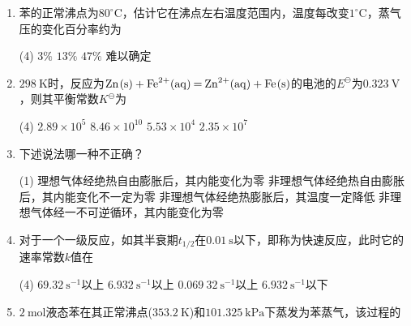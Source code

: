 \begin{enumerate}[label=\arabic*., itemsep=1.5ex]
    \begin{tasks}(4)
        \task 必定改变
        \task 必定不变
        \task 不一定变
        \task 状态与内能无关
    \end{tasks}
    \item 苯的正常沸点为$80^\circ\mathrm{C}$，估计它在沸点左右温度范围内，温度每改变$1^\circ\mathrm{C}$，蒸气压的变化百分率约为
    \begin{tasks}(4)
        \task $3\%$
        \task $13\%$
        \task $47\%$
        \task 难以确定
    \end{tasks}
    \item $298\ \mathrm{K}$时，反应为$\ce{Zn(s) + Fe^{2+}(aq) = Zn^{2+}(aq) + Fe(s)}$的电池的$E^\ominus$为$0.323\ \mathrm{V}$，则其平衡常数$K^\ominus$为
    \begin{tasks}(4)
        \task $2.89\times10^5$
        \task $8.46\times10^{10}$
        \task $5.53\times10^4$
        \task $2.35\times10^7$
    \end{tasks}
    \item 下述说法哪一种不正确？
    \begin{tasks}(1)
        \task 理想气体经绝热自由膨胀后，其内能变化为零
        \task 非理想气体经绝热自由膨胀后，其内能变化不一定为零
        \task 非理想气体经绝热膨胀后，其温度一定降低
        \task 非理想气体经一不可逆循环，其内能变化为零
    \end{tasks}
    \item 对于一个一级反应，如其半衰期$t_{1/2}$在$0.01\ \mathrm{s}$以下，即称为快速反应，此时它的速率常数$k$值在
    \begin{tasks}(4)
        \task $69.32\ \mathrm{s^{-1}}$以上
        \task $6.932\ \mathrm{s^{-1}}$以上
        \task $0.069\ 32\ \mathrm{s^{-1}}$以上
        \task $6.932\ \mathrm{s^{-1}}$以下
    \end{tasks}
    \item $2\ \mathrm{mol}$液态苯在其正常沸点($353.2\ \mathrm{K}$)和$101.325\ \mathrm{kPa}$下蒸发为苯蒸气，该过程的
    

\end{enumerate}
